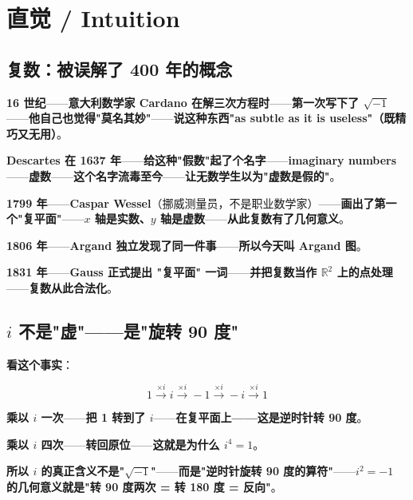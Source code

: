\section{直觉 / Intuition}

\subsection{复数：被误解了 400 年的概念}

\textbf{16 世纪}——\textbf{意大利数学家 Cardano 在解三次方程时}——\textbf{第一次写下了 $\sqrt{-1}$}——\textbf{他自己也觉得"莫名其妙"}——\textbf{说这种东西"as subtle as it is useless"（既精巧又无用）}。

\textbf{Descartes 在 1637 年}——\textbf{给这种"假数"起了个名字}——\textbf{imaginary numbers}——\textbf{虚数}——\textbf{这个名字\textbf{流毒至今}}——\textbf{让无数学生以为"虚数是假的"}。

\textbf{1799 年}——\textbf{Caspar Wessel}（挪威测量员，不是职业数学家）——\textbf{画出了第一个"复平面"}——\textbf{$x$ 轴是实数、$y$ 轴是虚数}——\textbf{从此复数有了\textbf{几何意义}}。

\textbf{1806 年}——\textbf{Argand 独立发现了同一件事}——\textbf{所以今天叫 Argand 图}。

\textbf{1831 年}——\textbf{Gauss 正式提出 "复平面" 一词}——\textbf{并把复数当作 $\mathbb{R}^2$ 上的点处理}——\textbf{复数从此\textbf{合法化}}。

\subsection{$i$ 不是"虚"——是"旋转 90 度"}

\textbf{看这个事实}：

\[
1 \xrightarrow{\times i} i \xrightarrow{\times i} -1 \xrightarrow{\times i} -i \xrightarrow{\times i} 1
\]

\textbf{乘以 $i$ 一次}——\textbf{把 1 转到了 $i$}——\textbf{在复平面上——这是\textbf{逆时针转 90 度}}。

\textbf{乘以 $i$ 四次}——\textbf{转回原位}——\textbf{这就是为什么 $i^4 = 1$}。

\textbf{所以 $i$ 的真正含义不是"$\sqrt{-1}$"}——\textbf{而是\textbf{"逆时针旋转 90 度的算符"}}——\textbf{$i^2 = -1$ 的几何意义就是"转 90 度两次 = 转 180 度 = 反向"}。

